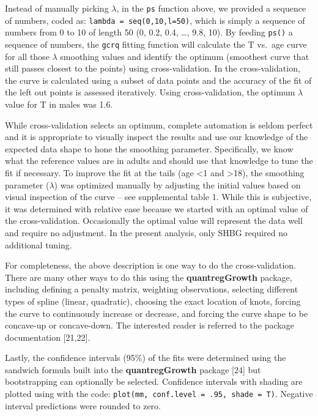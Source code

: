 \documentclass[]{elsarticle} %
\begin{document}
Instead of manually picking \(\lambda\), in the \texttt{ps} function
above, we provided a sequence of numbers, coded as:
\texttt{lambda\ =\ seq(0,10,l=50)}, which is simply a sequence of
numbers from 0 to 10 of length 50 (0, 0.2, 0.4, \ldots, 9.8, 10). By
feeding \texttt{ps()} a sequence of numbers, the \texttt{gcrq} fitting
function will calculate the T vs.~age curve for all those \(\lambda\)
smoothing values and identify the optimum (smoothest curve that still
passes closest to the points) using cross-validation. In the
cross-validation, the curve is calculated using a subset of data points
and the accuracy of the fit of the left out points is assessed
iteratively. Using cross-validation, the optimum \(\lambda\) value for T
in males was 1.6.

While cross-validation selects an optimum, complete automation is seldom
perfect and it is appropriate to visually inspect the results and use
our knowledge of the expected data shape to hone the smoothing
parameter. Specifically, we know what the reference values are in adults
and should use that knowledge to tune the fit if necessary. To improve
the fit at the tails (age \textless1 and \textgreater18), the smoothing
parameter (\(\lambda\)) was optimized manually by adjusting the initial
values based on visual inspection of the curve -- see supplemental table
1. While this is subjective, it was determined with relative ease
because we started with an optimal value of the cross-validation.
Occasionally the optimal value will represent the data well and require
no adjustment. In the present analysis, only SHBG required no additional
tuning.

For completeness, the above description is one way to do the
cross-validation. There are many other ways to do this using the
\textbf{quantregGrowth} package, including defining a penalty matrix,
weighting observations, selecting different types of spline (linear,
quadratic), choosing the exact location of knots, forcing the curve to
continuously increase or decrease, and forcing the curve shape to be
concave-up or concave-down. The interested reader is referred to the
package documentation {[}21,22{]}.

Lastly, the confidence intervals (95\%) of the fits were determined
using the sandwich formula built into the \textbf{quantregGrowth}
package {[}24{]} but bootstrapping can optionally be selected.
Confidence intervals with shading are plotted using with the code:
\texttt{plot(mm,\ conf.level\ =\ .95,\ shade\ =\ T)}. Negative interval
predictions were rounded to zero.
\end{document}
